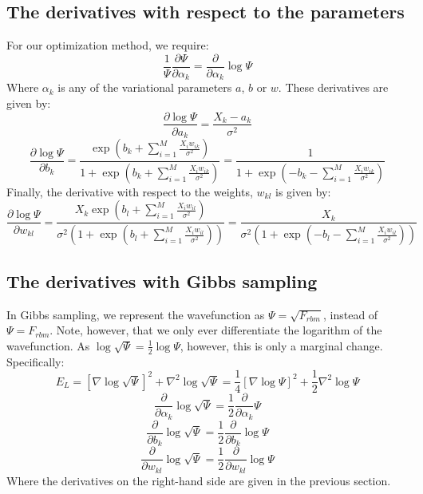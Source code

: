 \documentclass[a4paper, 10pt]{article}
\begin{document}
\begin{appendices}
	\subsection{The derivatives with respect to the parameters}
	For our optimization method, we require:
	\begin{equation}
	\frac{1}{\Psi}\frac{\partial \Psi}{\partial \alpha_k}=\frac{\partial }{\partial \alpha_k}\log \Psi
	\end{equation}
	Where $\alpha_k$ is any of the variational parameters $a$, $b$ or $w$. These derivatives are given by:
	\begin{equation}
	\frac{\partial \log \Psi }{\partial a_k}=\frac{X_k-a_k}{\sigma^2}
	\end{equation}
	\begin{equation}
	\frac{\partial \log \Psi}{\partial b_k}=\frac{\exp \left(b_k+\sum_{i=1}^M \frac{X_iw_{ik}}{\sigma^2}\right)}{1+\exp \left(b_k+\sum_{i=1}^M \frac{X_iw_{ik}}{\sigma^2}\right)}=\frac{1}{1+\exp \left(-b_k-\sum_{i=1}^M \frac{X_i w_{ik}}{\sigma^2}\right)}
	\end{equation}
	Finally, the derivative with respect to the weights, $w_{kl}$ is given by:
	\begin{equation}
	\frac{\partial \log \Psi}{\partial w_{kl}}=\frac{X_k\exp\left(b_l+\sum_{i=1}^M \frac{X_iw_{il}}{\sigma^2}\right)}{\sigma^2\left(1+\exp \left( b_l + \sum_{i=1}^M \frac{X_iw_{il}}{\sigma^2}\right)\right)}=\frac{X_k}{\sigma^2\left(1+\exp \left(-b_l-\sum_{i=1}^M \frac{X_iw_{il}}{\sigma^2}\right)\right)}
	\end{equation}
	\subsection{The derivatives with Gibbs sampling}
	In Gibbs sampling, we represent the wavefunction as $\Psi=\sqrt{F_{rbm}}$, instead of $\Psi=F_{rbm}$. Note, however, that we only ever differentiate the logarithm of the wavefunction. As $\log \sqrt{\Psi}=\frac{1}{2}\log \Psi$, however, this is only a marginal change. Specifically:
	\begin{equation}
	E_L=[\nabla \log \sqrt{\Psi}]^2 + \nabla^2 \log \sqrt{\Psi} =\frac{1}{4}[\nabla \log \Psi]^2 +\frac{1}{2}\nabla^2 \log \Psi
	\end{equation}
	\begin{equation}
	\frac{\partial }{\partial \alpha_k}\log \sqrt{\Psi}=\frac{1}{2}\frac{\partial }{\partial \alpha_k}\Psi
	\end{equation}
	\begin{equation}
	\frac{\partial }{\partial b_k}\log \sqrt{\Psi}=\frac{1}{2}\frac{\partial }{\partial b_k}\log \Psi 
	\end{equation}
	\begin{equation}
	\frac{\partial}{\partial w_{kl}}\log \sqrt{\Psi}=\frac{1}{2}\frac{\partial}{\partial w_{kl}}\log \Psi
	\end{equation}
	Where the derivatives on the right-hand side are given in the previous section.

\end{appendices}
\end{document}
